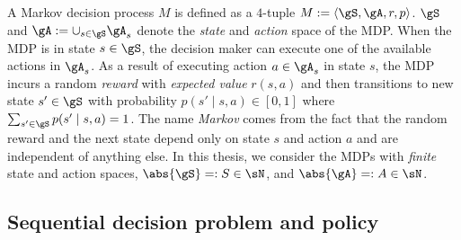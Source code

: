 A Markov decision process $M$ is defined as a $4$-tuple $M:=\langle\gS, \gA, r, p\rangle$.
$\gS$ and $\gA:=\cup_{s\in\gS}\gA_s$ denote the \emph{state} and \emph{action} space of the MDP.
When the MDP is in state $s\in\gS$, the decision maker can execute one of the available actions in $\gA_s$.
As a result of executing action $a\in\gA_s$ in state $s$, the MDP incurs a random \emph{reward} with \emph{expected value} $r(s,a)$ and then transitions to new state $s'\in\gS$ with probability $p(s'\mid s, a)\in[0,1]$ where $\sum_{s'\in\gS}p(s'\mid s,a)=1$.
The name \emph{Markov} comes from the fact that the random reward and the next state depend only on state $s$ and action $a$ and are independent of anything else.
In this thesis, we consider the MDPs with \emph{finite} state and action spaces, $\abs{\gS}=:S\in\sN$, and $\abs{\gA}=:A\in\sN$.


\subsection{Sequential decision problem and policy}


